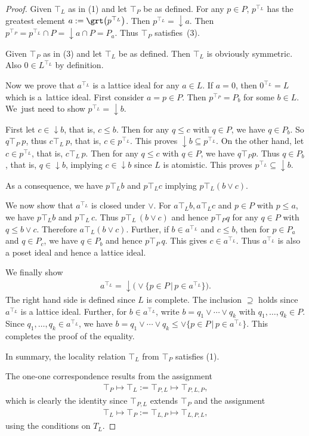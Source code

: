 \documentclass[10pt,a4paper]{amsart}
\numberwithin{equation}{section}
\begin{document}
\begin{proof}
Given $\top_L$ as in (1) and let $\top_P$ be as defined. For any $p\in P$, $p^{\top_L}$ has the greatest element $a:=\grt \big(p^{\top_L}\big)$. Then $p^{\top_L}=\downarrow a$. Then $p^{\top_P}=p^{\top_L}\cap P= \downarrow a \cap P=P_a$. Thus $\top_P$ satisfies~(3).

Given $\top_P$ as in (3) and let $\top_L$ be as defined. Then $\top_L$ is obviously symmetric. Also $0\in L^{\top_L}$ by definition.

Now we prove that $a^{\top _L}$ is a lattice ideal for any $a\in L$. If $a=0$, then $0^{\top _L}=L$ which is a~lattice ideal. First consider $a=p\in P$. Then $p^{\top _P}=P_b$ for some $b\in L$. We~just need to show $p^{\top_L}=\downarrow b$.
	
First let $c\in \downarrow b$, that is, $c\le b$. Then for any $q\le c$ with $q\in P$, we have $q\in P_b$. So $q\top _P \ p$, thus $c\top _L \ p$, that is, $c\in p^{\top_L}$. This proves $\downarrow b \subseteq p^{\top_L}$.
On the other hand, let $c\in p^{\top_L}$, that is, $c\top_L\, p$. Then for any $q\leq c$ with $q\in P$, we have $q\top_P p$. Thus $q\in P_b$, that is, $q\in \downarrow b$, implying $c\in \downarrow b$ since $L$ is atomistic. This proves $p^{\top_L}\subseteq \downarrow b$.

As a consequence, we have $p\top_L b$ and $p\top_L c$ implying $p\top_L(b\vee c)$.

We now show that $a^{\top_L}$ is closed under $\vee$. For $a\top_L b, a\top_L c$ and $p\in P$ with $p\leq a$, we have $p\top_L b$ and $p\top_L\, c$. Thus $p\top_L\, (b\vee c)$ and hence $p\top_P q$ for any $q\in P$ with $q\leq b\vee c$. Therefore $a \top_L (b\vee c)$. Further, if $b\in a^{\top_L}$ and $c\leq b$, then for $p\in P_a$ and $q\in P_c$, we have $q\in P_b$ and hence $p\top_P\, q$. This gives $c\in a^{\top_L}$. Thus $a^{\top_L}$ is also a poset ideal and hence a lattice ideal.

We finally show
\begin{gather*}
a^{\top_L} = \downarrow \big(\vee\big\{p\in P\,|\, p\in a^{\top_L}\big\}\big).
\end{gather*}
The right hand side is defined since $L$ is complete. The inclusion $\supseteq $ holds since $a^{\top _L}$ is a lattice ideal. Further, for $b\in a^{\top_L}$, write $b=q_1\vee \cdots \vee q_k$ with $q_1,\ldots,q_k\in P$. Since $q_1,\ldots, q_k\in a^{\top_L}$, we have $b=q_1\vee \cdots \vee q_k\leq \vee\big\{p\in P\,|\, p\in a^{\top_L}\big\}$. This completes the proof of the equality.

In summary, the locality relation $\top_L$ from $\top_P$ satisfies (1).

The one-one correspondence results from the assignment
\begin{gather*}\top_P\mapsto \top_L:=\top_{P,L}\mapsto \top_{P,L,P},
\end{gather*}
which is clearly the identity since $\top_{P,L}$ extends $\top_P$ and the assignment
\begin{gather*}
\top_L\mapsto \top_P:=\top_{L,P}\mapsto \top_{L,P,L},
\end{gather*}
 using the conditions on $T_L$.
\end{proof}
\end{document}
